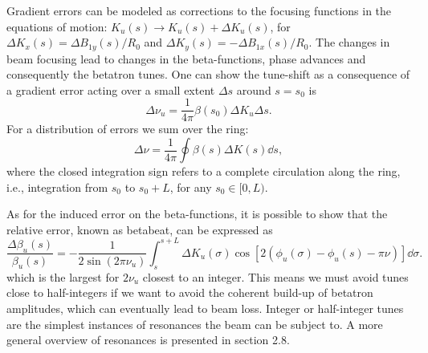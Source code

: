 
    Gradient errors can be modeled as corrections to the focusing functions in the equations of motion: $K_u(s)\to K_u(s) + \Delta K_u(s)$, for $\Delta K_x(s) = \Delta B_{1y}(s)/R_0$ and $\Delta K_y(s) = -\Delta B_{1x}(s)/R_0$. The changes in beam focusing lead to changes in the beta-functions, phase advances and consequently the betatron tunes. One can show the tune-shift as a consequence of a gradient error acting over a small extent $\Delta s$ around $s=s_0$ is \cite{lee_accelerator_2004}
         \begin{equation}
        \Delta \nu_u = \frac{1}{4\pi} \beta(s_0) \Delta K_u \Delta s.
        \label{eq:delta_nu}
     \end{equation}
     For a distribution of errors we sum over the ring:
     \begin{equation}
        \Delta \nu = \frac{1}{4\pi}\oint \beta(s) \Delta K(s) \dd s,
        \label{eq:delta_nu_dist}
    \end{equation}
    where the closed integration sign refers to a complete circulation along the ring, i.e., integration from $s_0$ to $s_0+L$, for any $s_0\in[0,L)$.

    As for the induced error on the beta-functions, it is possible to show that the relative error, known as betabeat, can be expressed as
     \begin{equation}
        \frac{\Delta \beta_u(s)}{\beta_u(s)} = - \frac{1}{2\sin(2\pi\nu_u)}\int_{s}^{s+L}\Delta K_u(\sigma)\cos[2(\phi_u(\sigma)-\phi_u(s)-\pi\nu)]\dd\sigma.
        \label{eq:beta_beat}
     \end{equation}
which is the largest for $2\nu_u$ closest to an integer. This means we must avoid tunes close to half-integers if we want to avoid the coherent build-up of betatron amplitudes, which can eventually lead to beam loss.
Integer or half-integer tunes are the simplest instances of resonances the beam can be subject to. A more general overview of resonances is presented in section 2.8.
